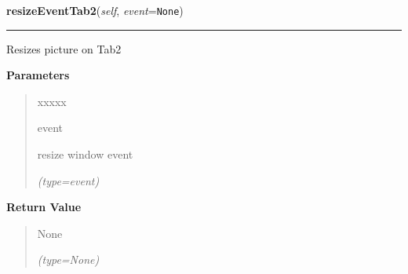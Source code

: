 \hspace{.8\funcindent}\begin{boxedminipage}{\funcwidth}

    \raggedright \textbf{resizeEventTab2}(\textit{self}, \textit{event}={\tt None})

    \vspace{-1.5ex}

    \rule{\textwidth}{0.5\fboxrule}
\setlength{\parskip}{2ex}
    Resizes picture on Tab2

\setlength{\parskip}{1ex}
      \textbf{Parameters}
      \vspace{-1ex}

      \begin{quote}
        \begin{Ventry}{xxxxx}

          \item[event]

          resize window event

            {\it (type=event)}

        \end{Ventry}

      \end{quote}

      \textbf{Return Value}
    \vspace{-1ex}

      \begin{quote}
      None

      {\it (type=None)}

      \end{quote}

    \end{boxedminipage}

    \label{client_gui:GuiClass:resizeIm}

    \vspace{0.5ex}

